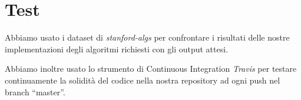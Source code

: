 \section{Test}
\label{cap:tests}

Abbiamo usato i dataset di \textit{stanford-algs} per confrontare i risultati delle nostre implementazioni degli algoritmi richiesti con gli output attesi.

\noindent Abbiamo inoltre usato lo strumento di Continuous Integration \textit{Travis} per testare continuamente la solidità del codice nella nostra repository ad ogni push nel branch ``master''.
